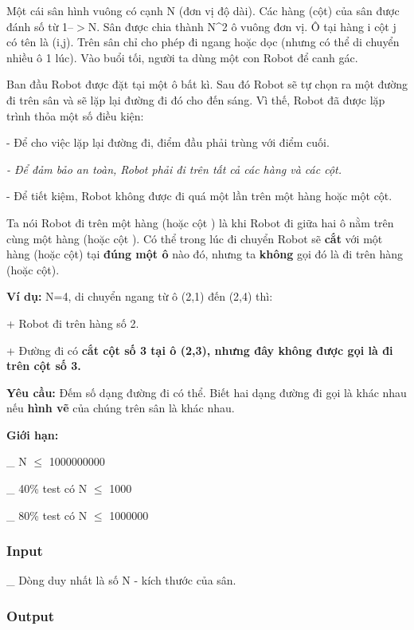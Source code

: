 



   Một cái sân hình vuông có cạnh N (đơn vị độ dài). Các hàng (cột) của sân được đánh số từ 1--$>$N. Sân được chia thành N^2 ô vuông đơn vị. Ô tại hàng i cột j có tên là (i,j). Trên sân chỉ cho phép đi ngang hoặc dọc (nhưng có thể di chuyển nhiều ô 1 lúc). Vào buổi tối, người ta dùng một con Robot để canh gác.  

   Ban đầu Robot được đặt tại một ô bất kì. Sau đó Robot sẽ tự chọn ra một đường đi trên sân và sẽ lặp lại đường đi đó cho đến sáng. Vì thế, Robot đã được lặp trình thỏa một số điều kiện:  

- Để cho việc lặp lại đường đi, điểm đầu phải trùng với điểm cuối.

\emph{    - Để đảm bảo an toàn, Robot phải đi trên tất cả các hàng và các cột.    
\\}

- Để tiết kiệm, Robot không được đi quá một lần trên một hàng hoặc một cột.

   Ta nói   Robot đi trên một hàng   (hoặc   cột   ) là khi Robot đi giữa   hai ô nằm trên cùng một hàng   (hoặc   cột   ). Có thể trong lúc đi chuyển Robot sẽ   \textbf{    cắt   }   với một hàng (hoặc cột) tại   \textbf{    đúng một ô   }   nào đó, nhưng ta   \textbf{    không   }   gọi đó là đi trên hàng (hoặc cột).  

\textbf{     Ví dụ:    }N=4, di chuyển ngang từ ô (2,1) đến (2,4) thì:

+ Robot đi trên hàng số 2.

+ Đường đi có    \textbf{     cắt    cột số 3 tại ô (2,3), nhưng đây    \textbf{     không    }    được gọi là đi trên cột số 3.   }

\textbf{      Yêu cầu:     }   Đếm số dạng đường đi có thể. Biết hai dạng đường đi gọi là khác nhau nếu   \textbf{    hình vẽ   }   của chúng trên sân là khác nhau.  

\textbf{      Giới hạn:     }

\_ N $\le$ 1000000000

\_ 40\% test có N $\le$ 1000

\_ 80\% test có N $\le$ 1000000

\subsubsection{   Input  }

   \_ Dòng duy nhất là số N - kích thước của sân.  

\subsubsection{   Output  }

